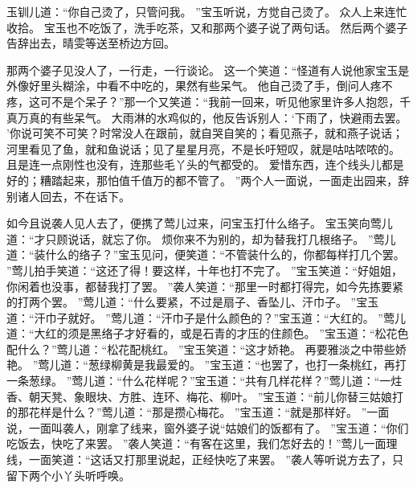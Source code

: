 玉钏儿道：“你自己烫了，只管问我。
”宝玉听说，方觉自己烫了。
众人上来连忙收拾。
宝玉也不吃饭了，洗手吃茶，又和那两个婆子说了两句话。
然后两个婆子告辞出去，晴雯等送至桥边方回。
\par
那两个婆子见没人了，一行走，一行谈论。
这一个笑道：“怪道有人说他家宝玉是外像好里头糊涂，中看不中吃的，果然有些呆气。
他自己烫了手，倒问人疼不疼，这可不是个呆子？”那一个又笑道：“我前一回来，听见他家里许多人抱怨，千真万真的有些呆气。
大雨淋的水鸡似的，他反告诉别人：‘下雨了，快避雨去罢。
’你说可笑不可笑？时常没人在跟前，就自哭自笑的；看见燕子，就和燕子说话；河里看见了鱼，就和鱼说话；见了星星月亮，不是长吁短叹，就是咕咕哝哝的。
且是连一点刚性也没有，连那些毛丫头的气都受的。
爱惜东西，连个线头儿都是好的；糟踏起来，那怕值千值万的都不管了。
”两个人一面说，一面走出园来，辞别诸人回去，不在话下。
\par
如今且说袭人见人去了，便携了莺儿过来，问宝玉打什么络子。
宝玉笑向莺儿道：“才只顾说话，就忘了你。
烦你来不为别的，却为替我打几根络子。
”莺儿道：“装什么的络子？”宝玉见问，便笑道：“不管装什么的，你都每样打几个罢。
”莺儿拍手笑道：“这还了得！要这样，十年也打不完了。
”宝玉笑道：“好姐姐，你闲着也没事，都替我打了罢。
”袭人笑道：“那里一时都打得完，如今先拣要紧的打两个罢。
”莺儿道：“什么要紧，不过是扇子、香坠儿、汗巾子。
”宝玉道：“汗巾子就好。
”莺儿道：“汗巾子是什么颜色的？”宝玉道：“大红的。
”莺儿道：“大红的须是黑络子才好看的，或是石青的才压的住颜色。
”宝玉道：“松花色配什么？”莺儿道：“松花配桃红。
”宝玉笑道：“这才娇艳。
再要雅淡之中带些娇艳。
”莺儿道：“葱绿柳黄是我最爱的。
”宝玉道：“也罢了，也打一条桃红，再打一条葱绿。
”莺儿道：“什么花样呢？”宝玉道：“共有几样花样？”莺儿道：“一炷香、朝天凳、象眼块、方胜、连环、梅花、柳叶。
”宝玉道：“前儿你替三姑娘打的那花样是什么？”莺儿道：“那是攒心梅花。
”宝玉道：“就是那样好。
”一面说，一面叫袭人，刚拿了线来，窗外婆子说“姑娘们的饭都有了。
”宝玉道：“你们吃饭去，快吃了来罢。
”袭人笑道：“有客在这里，我们怎好去的！”莺儿一面理线，一面笑道：“这话又打那里说起，正经快吃了来罢。
”袭人等听说方去了，只留下两个小丫头听呼唤。
